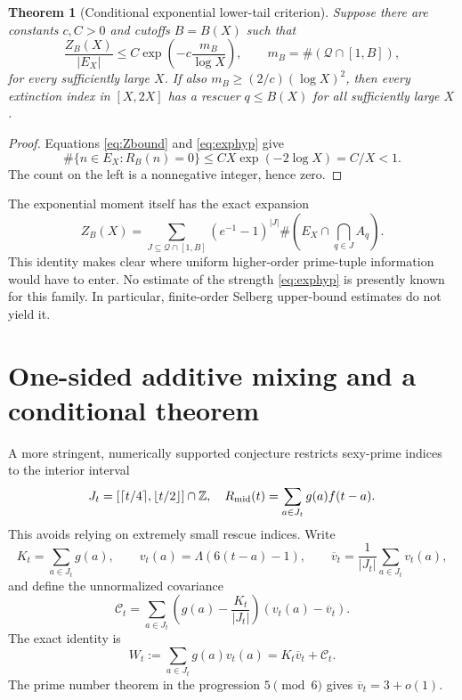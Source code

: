 \documentclass[11pt,a4paper]{article}
\newtheorem{theorem}{Theorem}[section]
\theoremstyle{definition}
\newcommand{\Qcal}{\mathcal Q}
\begin{document}
\begin{theorem}[Conditional exponential lower-tail criterion]
Suppose there are constants $c,C>0$ and cutoffs $B=B(X)$ such that
\begin{equation}\label{eq:exphyp}
 \frac{Z_B(X)}{|E_X|}\le
 C\exp\left(-c\frac{m_B}{\log X}\right),
 \qquad m_B=\#(\Qcal\cap[1,B]),
\end{equation}
for every sufficiently large $X$. If also
$m_B\ge(2/c)(\log X)^2$, then every extinction index in
$[X,2X]$ has a rescuer $q\le B(X)$ for all sufficiently large $X$.
\end{theorem}
\begin{proof}
Equations \eqref{eq:Zbound} and \eqref{eq:exphyp} give
\[
 \#\{n\in E_X:R_B(n)=0\}\le
 CX\exp(-2\log X)=C/X<1.
\]
The count on the left is a nonnegative integer, hence zero.
\end{proof}

The exponential moment itself has the exact expansion
\begin{equation}\label{eq:Zexpand}
 Z_B(X)=\sum_{J\subseteq\Qcal\cap[1,B]}
 (e^{-1}-1)^{|J|}
 \#\left(E_X\cap\bigcap_{q\in J}A_q\right).
\end{equation}
This identity makes clear where uniform higher-order prime-tuple
information would have to enter. No estimate of the strength
\eqref{eq:exphyp} is presently known for this family. In particular,
finite-order Selberg upper-bound estimates do not yield it.

\section{One-sided additive mixing and a conditional theorem}

A more stringent, numerically supported conjecture restricts sexy-prime
indices to the interior interval
\begin{equation}
 J_t=[\lceil t/4\rceil,\lfloor t/2\rfloor]\cap\mathbb Z,
 \quad R_{\rm mid}(t)=\sum_{a\in J_t}g(a)f(t-a).
\end{equation}
This avoids relying on extremely small rescue indices.
Write
\[
 K_t=\sum_{a\in J_t}g(a),\qquad
 v_t(a)=\Lambda(6(t-a)-1),\qquad
 \overline v_t=\frac{1}{|J_t|}\sum_{a\in J_t}v_t(a),
\]
and define the unnormalized covariance
\[
 \mathcal C_t=\sum_{a\in J_t}
 \left(g(a)-\frac{K_t}{|J_t|}\right)
 (v_t(a)-\overline v_t).
\]
The exact identity is
\begin{equation}\label{eq:cov}
 W_t:=\sum_{a\in J_t}g(a)v_t(a)
       =K_t\overline v_t+\mathcal C_t.
\end{equation}
The prime number theorem in the progression $5\pmod6$ gives
$\overline v_t=3+o(1)$.
\end{document}
